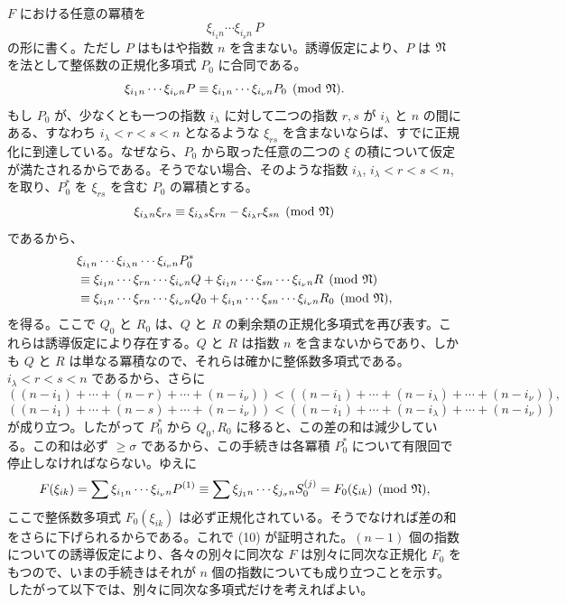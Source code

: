 \documentclass[11pt]{article}
\begin{document}
\(F\) における任意の冪積を
\[
        \xi_{i_1n}\cdots\xi_{i_\nu n}\,P
\]
の形に書く。ただし \(P\) はもはや指数 \(n\) を含まない。誘導仮定により、\(P\) は \(\mathfrak N\) を法として整係数の正規化多項式 \(P_0\) に合同である。
\[
        \xi_{i_1n}\cdots\xi_{i_\nu n}P
        \equiv
        \xi_{i_1n}\cdots\xi_{i_\nu n}P_0
        \pmod{\mathfrak N}.
\]
もし \(P_0\) が、少なくとも一つの指数 \(i_\lambda\) に対して二つの指数 \(r,s\) が \(i_\lambda\) と \(n\) の間にある、すなわち \(i_\lambda<r<s<n\) となるような \(\xi_{rs}\) を含まないならば、すでに正規化に到達している。なぜなら、\(P_0\) から取った任意の二つの \(\xi\) の積について仮定が満たされるからである。そうでない場合、そのような指数 \(i_\lambda\), \(i_\lambda<r<s<n\), を取り、\(P_0^*\) を \(\xi_{rs}\) を含む \(P_0\) の冪積とする。
\[
        \xi_{i_\lambda n}\xi_{rs}\equiv
        \xi_{i_\lambda s}\xi_{rn}-\xi_{i_\lambda r}\xi_{sn}
        \pmod{\mathfrak N}
\]
であるから、
\begin{align*}
 &\xi_{i_1n}\cdots\xi_{i_\lambda n}\cdots\xi_{i_\nu n}P_0^*\\
 &\equiv
 \xi_{i_1n}\cdots\xi_{rn}\cdots\xi_{i_\nu n}Q
 +
 \xi_{i_1n}\cdots\xi_{sn}\cdots\xi_{i_\nu n}R
 \pmod{\mathfrak N}\\
 &\equiv
 \xi_{i_1n}\cdots\xi_{rn}\cdots\xi_{i_\nu n}Q_0
 +
 \xi_{i_1n}\cdots\xi_{sn}\cdots\xi_{i_\nu n}R_0
 \pmod{\mathfrak N},
\end{align*}
を得る。ここで \(Q_0\) と \(R_0\) は、\(Q\) と \(R\) の剰余類の正規化多項式を再び表す。これらは誘導仮定により存在する。\(Q\) と \(R\) は指数 \(n\) を含まないからであり、しかも \(Q\) と \(R\) は単なる冪積なので、それらは確かに整係数多項式である。\(i_\lambda<r<s<n\) であるから、さらに
\[
 ((n-i_1)+\cdots+(n-r)+\cdots+(n-i_\nu))
 <
 ((n-i_1)+\cdots+(n-i_\lambda)+\cdots+(n-i_\nu)),
\]
\[
 ((n-i_1)+\cdots+(n-s)+\cdots+(n-i_\nu))
 <
 ((n-i_1)+\cdots+(n-i_\lambda)+\cdots+(n-i_\nu))
\]
が成り立つ。したがって \(P_0^*\) から \(Q_0,R_0\) に移ると、この差の和は減少している。この和は必ず \(\ge\sigma\) であるから、この手続きは各冪積 \(P_0^*\) について有限回で停止しなければならない。ゆえに
\[
        F(\xi_{ik})
        =
        \sum \xi_{i_1n}\cdots\xi_{i_\nu n}P^{(1)}
        \equiv
        \sum \xi_{j_1n}\cdots\xi_{j_\sigma n}S_0^{(j)}
        =
        F_0(\xi_{ik})\pmod{\mathfrak N},
\]
ここで整係数多項式 \(F_0(\xi_{ik})\) は必ず正規化されている。そうでなければ差の和をさらに下げられるからである。これで (10) が証明された。\((n-1)\) 個の指数についての誘導仮定により、各々の別々に同次な \(F\) は別々に同次な正規化 \(F_0\) をもつので、いまの手続きはそれが \(n\) 個の指数についても成り立つことを示す。したがって以下では、別々に同次な多項式だけを考えればよい。
\end{document}
